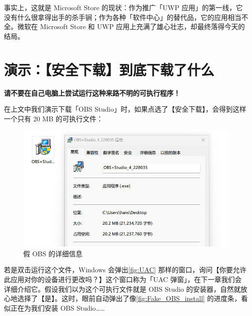 {{事实上，这就是 Microsoft Store 的现状：作为推广「UWP 应用」的第一线，它没有什么很拿得出手的杀手锏；作为各种「软件中心」的替代品，它的应用相当不全。微软在 Microsoft Store 和 UWP 应用上充满了雄心壮志，却最终落得今天的结局。

\section{演示：【安全下载】到底下载了什么}

\begin{danger}
  \textbf{请不要在自己电脑上尝试运行这种来路不明的可执行程序！}
\end{danger}

在上文中我们演示下载「OBS Studio」时，如果点选了【安全下载】，会得到这样一个只有 20 MB 的可执行文件：

\begin{figure}[htb!]
  \centering
  \includegraphics[width=.6\textwidth]{assets/basic/Fake_OBS_installer.png}
  \caption{假 OBS 的详细信息}
  \label{fig:Fake_OBS_installer}
\end{figure}

若是双击运行这个文件，Windows 会弹出\autoref{fig:UAC} 那样的窗口，询问【你要允许此应用对你的设备进行更改吗？】这个窗口称为「UAC 弹窗」，在下一章我们会详细介绍它。假设我们以为这个可执行文件就是 OBS Studio 的安装器，自然就放心地选择了【是】。这时，眼前自动弹出了像\autoref{fig:Fake_OBS_install} 的进度条，看似正在为我们安装 OBS Studio……

}}
